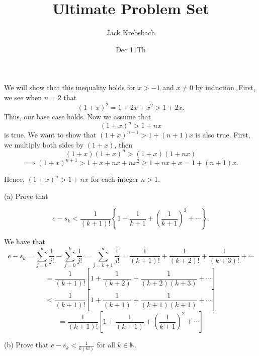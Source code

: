\documentclass{report}
\title{Ultimate Problem Set}
\author{Jack Krebsbach }
\date{Dec 11Th}
\begin{document}
\maketitle




\begin{myproof}
We will show that this inequality holds for $x>-1$ and $x\not= 0$ by induction. First, we see when $n=2$ that $$ (1+x)^2 = 1 +2x + x^2 > 1+2x.$$ Thus, our base case holds. Now we assume that $$ (1+x)^n > 1 +nx$$ is true. We want to show that
$ (1+x)^{n+1} > 1 +(n+1)x$
is also true. First, we multiply both sides by $(1+x)$, then $$(1+x)(1+x)^n > (1+x)(1+nx)$$
$$ \implies (1+x)^{n+1} > 1 + x + nx + nx^2 \geq 1 + nx + x = 1 + (n+1)x.$$

Hence, $(1+x)^n>1+n x$ for each integer $n>1$.

\end{myproof}

\pagebreak
{}

(a) Prove that

$$
e-s_k<\frac{1}{(k+1) !}\left\{1+\frac{1}{k+1}+\left(\frac{1}{k+1}\right)^2+\cdots\right\} .
$$

\begin{myproof}
    
We have that
$$ e-s_k = \sum_{j=0}^{\infty} \frac{1}{j !} - \sum_{j=0}^k \frac{1}{j !} = \sum_{j=k+1}^{\infty} \frac{1}{j !} = \frac{1}{(k+1)!} +\frac{1}{(k+2)!}+ \frac{1}{(k+3)!} + \cdots$$ $$= \frac{1}{(k+1)!}\left[1 + \frac{1}{(k+2)}  + \frac{1}{(k+2)(k+3)} + \cdots \right]$$
$$< \frac{1}{(k+1)!}\left[1 + \frac{1}{(k+1)}  + \frac{1}{(k+1)(k+1)} + \cdots \right]$$
$$= \frac{1}{(k+1)!}\left[1 + \frac{1}{(k+1)}  + \left(\frac{1}{k+1}\right)^2 + \cdots \right]$$
\bigskip
\end{myproof}
\bigskip
(b) Prove that $e-s_k<\frac{1}{k(k!)}$ for all $k \in \mathbb{N}$.
\end{document}
